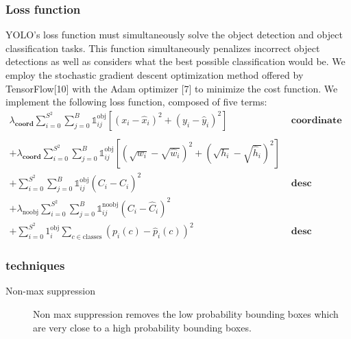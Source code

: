 \documentclass[a4paper]{article}
\begin{document}
\subsubsection*{Loss function}
YOLO’s loss function must simultaneously solve the object detection and object classification tasks. This function
simultaneously penalizes incorrect object detections
as well as considers what the best possible classification
would be. We employ the stochastic gradient descent
optimization method offered by TensorFlow[10] with the
Adam optimizer [7] to minimize the cost function. We
implement the following loss function, composed of five
terms:
\begin{align*}
\lambda_\textbf{coord}
\sum_{i = 0}^{S^2}
    \sum_{j = 0}^{B}
     {\mathbb{1}}_{ij}^{\text{obj}}
            \left[
            \left(
                x_i - \hat{x}_i
            \right)^2 +
            \left(
                y_i - \hat{y}_i
            \right)^2
            \right]&\textbf{\ coordinate loss}
\\\\
+ \lambda_\textbf{coord} 
\sum_{i = 0}^{S^2}
    \sum_{j = 0}^{B}
         {\mathbb{1}}_{ij}^{\text{obj}}
         \left[
        \left(
            \sqrt{w_i} - \sqrt{\hat{w}_i}
        \right)^2 +
        \left(
            \sqrt{h_i} - \sqrt{\hat{h}_i}
        \right)^2
        \right]\\
+ \sum_{i = 0}^{S^2}
    \sum_{j = 0}^{B}
        {\mathbb{1}}_{ij}^{\text{obj}}
        \left(
            C_i - \hat{C}_i
        \right)^2&\textbf{\ desc}
\\
+ \lambda_\textrm{noobj}
\sum_{i = 0}^{S^2}
    \sum_{j = 0}^{B}
    {\mathbb{1}}_{ij}^{\text{noobj}}
        \left(
            C_i - \hat{C}_i
        \right)^2\\ 
+ \sum_{i = 0}^{S^2}
{{1}}_i^{\text{obj}}
    \sum_{c \in \textrm{classes}}
        \left(
            p_i(c) - \hat{p}_i(c)
        \right)^2&\textbf{\ desc}
\end{align*}


\subsubsection*{techniques}
\begin{description}
\item[Non-max suppression] Non max suppression removes the low probability bounding boxes which are very close to a high probability bounding boxes.
\end{description}
\end{document}

